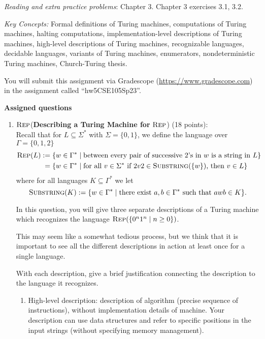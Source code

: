 \textit{Reading and extra practice problems}: Chapter 3. Chapter 3 exercises 3.1, 3.2. 

\textit{Key Concepts:} Formal definitions of Turing machines, computations of Turing machines, 
halting computations, implementation-level descriptions of Turing machines, high-level descriptions 
of Turing machines, recognizable languages, decidable languages, variants of Turing machines, 
enumerators, nondeterministic Turing machines, Church-Turing thesis.

\instructions

You will submit this assignment via Gradescope
(\href{https://www.gradescope.com}{https://www.gradescope.com}) 
in the assignment called ``hw5CSE105Sp23''.

\textbf{Assigned questions}

\begin{enumerate} 

\item $\textsc{Rep}$(\textbf{Describing a Turing Machine for }$\textsc{Rep}$) 
(18 points): \\
Recall that for $L \subseteq \Sigma^*$ with $\Sigma = \{0,1\}$, 
we define the language over $\Gamma = \{0,1,2\}$
\begin{align*}
\textsc{Rep}(L) &:= \{ w \in \Gamma^* \mid \text{between every pair of successive $2$'s in $w$ is a string in $L$}\}\\
&\phantom{:}=\{w \in \Gamma^* \mid \text{for all } v \in \Sigma^* \text{ if } 2v2 \in \textsc{Substring}(\{w\})  
\text{, then } v \in L\} 
\end{align*}
where for all languages $K \subseteq \Gamma^*$ we let
\[
\textsc{Substring}(K) := \{ w \in \Gamma^* \mid \text{there exist } a,b \in \Gamma^* \text{ such that } awb \in K\}.
\]

In this question, you will give three separate descriptions of a Turing machine 
which recognizes the language $\textsc{Rep}(\{0^n1^n \mid n \ge 0\})$. 

This may seem like a somewhat tedious process, but we think that it is important 
to see all the different descriptions in action at least once for a single language.

With each description, give a brief justification connecting the description to the language it recognizes.

\begin{enumerate}
\item\gradeCompleteFirst High-level description: 
description of algorithm (precise sequence of instructions), 
without implementation details of machine. Your description 
can use data structures and refer to specific positions 
in the input strings (without specifying memory management).


\end{enumerate}
\end{enumerate}
